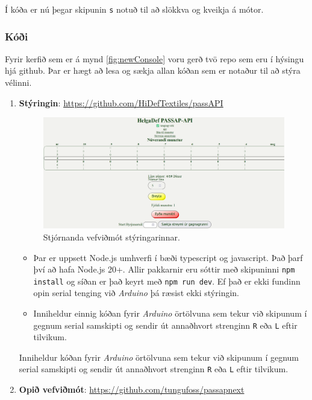 Í kóða er nú þegar skipunin \texttt{s} notuð til að slökkva og kveikja á mótor.
\subsubsection{Kóði}
Fyrir kerfið sem er á mynd \ref{fig:newConsole} voru gerð tvö repo sem eru í hýsingu hjá github. Þar er hægt að lesa og sækja allan kóðan sem er notaður til að stýra vélinni.
\begin{enumerate}
    \item \textbf{Stýringin}: \url{https://github.com/HiDefTextiles/passAPI}
    
        \begin{figure}[t] %
    \centering
    \includegraphics[width=0.8\linewidth]{myndir/passapiscreen.png}
    \caption{Stjórnanda vefviðmót stýringarinnar.}
    \label{fig:PASSAPMOTOR}
\end{figure}
    \begin{itemize}
        \item Þar er uppsett Node.js umhverfi í bæði typescript og javascript. Það þarf því að hafa Node.js 20+. Allir pakkarnir eru sóttir með skipuninni \texttt{npm install} og síðan er það keyrt með \texttt{npm run dev}. Ef það er ekki fundinn opin serial tenging við \textit{Arduino} þá ræsist ekki stýringin.
        \item     Inniheldur einnig kóðan fyrir \textit{Arduino} örtölvuna sem tekur við skipunum í gegnum serial samskipti og sendir út annaðhvort strenginn \texttt{R} eða \texttt{L} eftir tilvikum.
    \end{itemize}
    Inniheldur kóðan fyrir \textit{Arduino} örtölvuna sem tekur við skipunum í gegnum serial samskipti og sendir út annaðhvort strenginn \texttt{R} eða \texttt{L} eftir tilvikum.
    \item \textbf{Opið vefviðmót}: \url{https://github.com/tungufoss/passapnext} \\
    \begin{figure}[t] %

\end{figure}
\end{enumerate}
